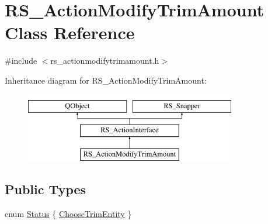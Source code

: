 \hypertarget{classRS__ActionModifyTrimAmount}{\section{R\-S\-\_\-\-Action\-Modify\-Trim\-Amount Class Reference}
\label{classRS__ActionModifyTrimAmount}
}


{\ttfamily \#include $<$rs\-\_\-actionmodifytrimamount.\-h$>$}

Inheritance diagram for R\-S\-\_\-\-Action\-Modify\-Trim\-Amount\-:\begin{figure}[H]
\begin{center}
\leavevmode
\includegraphics[height=3.000000cm]{classRS__ActionModifyTrimAmount}
\end{center}
\end{figure}
\subsection*{Public Types}
\begin{DoxyCompactItemize}
\item 
enum \hyperlink{classRS__ActionModifyTrimAmount_a6314bb72affee67564514e1365f414f8}{Status} \{ \hyperlink{classRS__ActionModifyTrimAmount_a6314bb72affee67564514e1365f414f8afbc21e39118ac7ed9e0fd2d517a41800}{Choose\-Trim\-Entity}
 \}
\end{DoxyCompactItemize}

